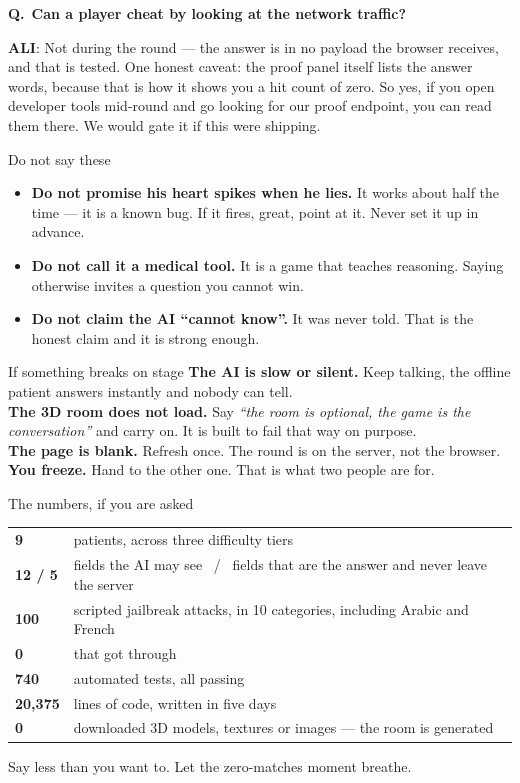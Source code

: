 \documentclass[11pt,a4paper]{article}
\newcommand{\A}{\textcolor{peridp}{\textbf{ALI}}}
\newcommand{\say}[1]{\textit{``#1''}}
\newcommand{\qa}[2]{%
  \par\smallskip\noindent\textbf{\textcolor{peridp}{Q.}}~\textbf{#1}\par
  \noindent\hspace{4.4mm}\begin{minipage}{0.95\linewidth}#2\end{minipage}\par\smallskip}
\begin{document}
\qa{Can a player cheat by looking at the network traffic?}{%
\A: Not during the round --- the answer is in no payload the browser receives, and that is
tested. One honest caveat: the proof panel itself lists the answer words, because that is how
it shows you a hit count of zero. So yes, if you open developer tools mid-round and go
looking for our proof endpoint, you can read them there. We would gate it if this were
shipping.}

\bigskip

\begin{panel}[bubble]{Do not say these}
\begin{itemize}[leftmargin=5mm,itemsep=1.2mm,topsep=0.8mm]
  \item \textbf{Do not promise his heart spikes when he lies.} It works about half the time --- it is a known bug. If it fires, great, point at it. Never set it up in advance.
  \item \textbf{Do not call it a medical tool.} It is a game that teaches reasoning. Saying otherwise invites a question you cannot win.
  \item \textbf{Do not claim the AI ``cannot know''.} It was never told. That is the honest claim and it is strong enough.
\end{itemize}
\end{panel}

\bigskip

\begin{panel}[lemon]{If something breaks on stage}
\textbf{The AI is slow or silent.} Keep talking, the offline patient answers instantly and nobody can tell.\\[1mm]
\textbf{The 3D room does not load.} Say \say{the room is optional, the game is the conversation} and carry on. It is built to fail that way on purpose.\\[1mm]
\textbf{The page is blank.} Refresh once. The round is on the server, not the browser.\\[1mm]
\textbf{You freeze.} Hand to the other one. That is what two people are for.
\end{panel}

\bigskip

\begin{panel}[mint]{The numbers, if you are asked}
\begin{tabularx}{\linewidth}{@{}lX@{}}
\textbf{9} & patients, across three difficulty tiers\\
\textbf{12 / 5} & fields the AI may see \ / \ fields that are the answer and never leave the server\\
\textbf{100} & scripted jailbreak attacks, in 10 categories, including Arabic and French\\
\textbf{0} & that got through\\
\textbf{740} & automated tests, all passing\\
\textbf{20{,}375} & lines of code, written in five days\\
\textbf{0} & downloaded 3D models, textures or images --- the room is generated\\
\end{tabularx}
\end{panel}

\vfill
\begin{center}
\textcolor{inksoft}{\small Say less than you want to. Let the zero-matches moment breathe.}
\end{center}
\end{document}
